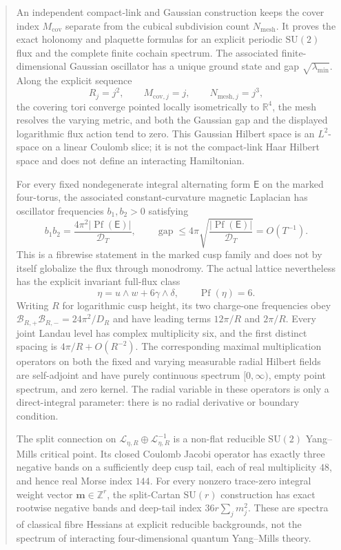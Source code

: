 \documentclass[11pt]{article}
\numberwithin{equation}{section}
\theoremstyle{definition}
\theoremstyle{remark}
\newcommand{\R}{\mathbb R}
\begin{document}
\begin{abstract}
An independent compact-link and Gaussian construction keeps the cover index
$M_{\mathrm{cov}}$ separate from the cubical subdivision count
$N_{\mathrm{mesh}}$.  It proves the exact holonomy and plaquette formulas for
an explicit periodic $\mathrm{SU}(2)$ flux and the complete finite cochain
spectrum.  The associated finite-dimensional Gaussian oscillator has a
unique ground state and gap $\sqrt{\lambda_{\min}}$.  Along the explicit
sequence
\[
 R_j=j^2,\qquad M_{\mathrm{cov},j}=j,\qquad
 N_{\mathrm{mesh},j}=j^3,
\]
the covering tori converge pointed locally isometrically to $\R^4$, the mesh
resolves the varying metric, and both the Gaussian gap and the displayed
logarithmic flux action tend to zero.  This Gaussian Hilbert space is an
$L^2$-space on a linear Coulomb slice; it is not the compact-link Haar
Hilbert space and does not define an interacting Hamiltonian.

For every fixed nondegenerate integral alternating form $\mathsf E$ on the
marked four-torus, the associated constant-curvature magnetic Laplacian has
oscillator frequencies $b_1,b_2>0$ satisfying
\[
 b_1b_2=\frac{4\pi^2|\operatorname{Pf}(\mathsf E)|}{\mathcal D_T},
 \qquad
 \operatorname{gap}\le
 4\pi\sqrt{\frac{|\operatorname{Pf}(\mathsf E)|}{\mathcal D_T}}
 =O(T^{-1}).
\]
This is a fibrewise statement in the marked cusp family and does not by
itself globalize the flux through monodromy.  The actual lattice nevertheless
has the explicit invariant full-flux class
\[
 \eta=u\wedge w+6\gamma\wedge\delta,
 \qquad \operatorname{Pf}(\eta)=6.
\]
Writing $R$ for logarithmic cusp height, its two charge-one frequencies obey
$\mathcal B_{R,+}\mathcal B_{R,-}=24\pi^2/D_R$ and have leading terms
$12\pi/R$ and $2\pi/R$.  Every joint Landau level has complex multiplicity
six, and the first distinct spacing is $4\pi/R+O(R^{-2})$.  The corresponding
maximal multiplication operators on both the fixed and varying measurable
radial Hilbert fields are self-adjoint and have purely continuous spectrum
$[0,\infty)$, empty point spectrum, and zero kernel.  The radial variable in
these operators is only a direct-integral parameter: there is no radial
derivative or boundary condition.

The split connection on
$\mathscr L_{\eta,R}\oplus\mathscr L_{\eta,R}^{-1}$ is a non-flat reducible
$\mathrm{SU}(2)$ Yang--Mills critical point.  Its closed Coulomb Jacobi
operator has exactly three negative bands on a sufficiently deep cusp tail,
each of real multiplicity $48$, and hence real Morse index $144$.  For every
nonzero trace-zero integral weight vector
$\mathbf m\in\mathbb Z^r$, the split-Cartan $\mathrm{SU}(r)$ construction has
exact rootwise negative bands and deep-tail index
$36r\sum_jm_j^2$.  These are spectra of classical fibre Hessians at explicit
reducible backgrounds, not the spectrum of interacting four-dimensional
quantum Yang--Mills theory.


\end{abstract}
\end{document}
